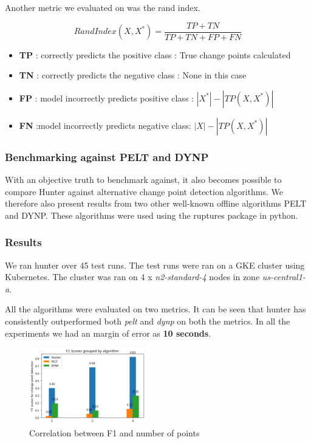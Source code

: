 \documentclass[sigconf]{acmart}
\begin{document}
Another metric we evaluated on was the rand index. 

$$RandIndex(X,X^*) = \frac{ TP + TN}{TP + TN+ FP+ FN}$$

\begin{itemize}
    \item \textbf{TP} : correctly predicts the positive class : True change points calculated
    \item \textbf{TN} : correctly predicts the negative class :  None in this case
    \item \textbf{FP} :  model incorrectly predicts positive class : $|X^*| - |TP(X,X^*)|$
    \item \textbf{FN} :model incorrectly predicts negative class: $|X| - |TP(X,X^*)|$
\end{itemize}

\subsubsection{Benchmarking against PELT and DYNP}

With an objective truth to benchmark against, it also becomes possible to compare Hunter against alternative change point detection algorithms. We therefore also present results from two other well-known offline algorithms PELT and DYNP. These algorithms were used using the ruptures package in python.\cite{SELECTREVIEW}

\subsubsection{Results}
We ran hunter over 45 test runs. The test runs were ran on a GKE cluster using Kubernetes. The cluster was ran on 4 x \textit{n2-standard-4} nodes in zone \textit{us-central1-a}. 

All the algorithms were evaluated on two metrics. It can be seen that hunter has consistently outperformed both \textit{pelt} and \textit{dynp} on both the metrics. In all the experiments we had an margin of error as \textbf{10 seconds}.

\begin{figure}[b]
	\includegraphics[width=0.45\textwidth]{bar-graph.png}
	\caption{Correlation between F1 and number of points }
\end{figure}
\end{document}
